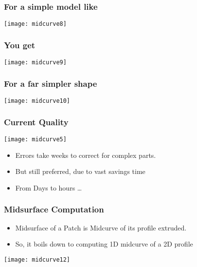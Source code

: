 \begin{frame}[fragile]\frametitle{For a simple model like}
\begin{center}
\texttt{[image: midcurve8]}
\end{center}	
\end{frame}

\begin{frame}[fragile]\frametitle{You get}
\begin{center}
\texttt{[image: midcurve9]}
\end{center}	
\end{frame}

\begin{frame}[fragile]\frametitle{For a far simpler shape}
\begin{center}
\texttt{[image: midcurve10]}
\end{center}	
\end{frame}

\begin{frame}[fragile]\frametitle{Current Quality}
\begin{center}
\texttt{[image: midcurve5]}
\end{center}
	\begin{itemize}
	\item Errors take weeks to correct for complex parts.
	\item But still preferred, due to vast savings time
	\item From Days to hours \ldots
	\end{itemize}
	
\end{frame}

\begin{frame}[fragile]\frametitle{Midsurface Computation}

	\begin{itemize}
	\item Midsurface of a Patch is Midcurve of its profile extruded.
	\item So, it boils down to computing 1D midcurve of a 2D profile
	\end{itemize}
	
\begin{center}
\texttt{[image: midcurve12]}
\end{center}	
\end{frame}

